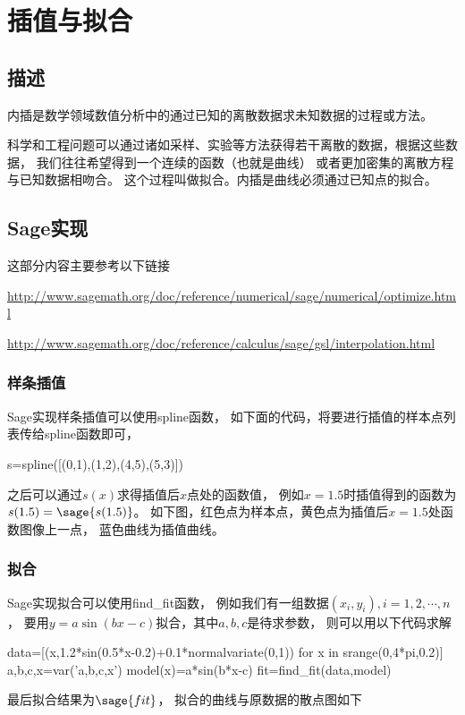 \section{插值与拟合}
\subsection{描述}
内插是数学领域数值分析中的通过已知的离散数据求未知数据的过程或方法。

科学和工程问题可以通过诸如采样、实验等方法获得若干离散的数据，根据这些数据，
我们往往希望得到一个连续的函数（也就是曲线）
或者更加密集的离散方程与已知数据相吻合。
这个过程叫做拟合。内插是曲线必须通过已知点的拟合。

\subsection{Sage实现}
这部分内容主要参考以下链接

\href{http://www.sagemath.org/doc/reference/numerical/sage/numerical/optimize.html}{http://www.sagemath.org/doc/reference/numerical/sage/numerical/optimize.html}

\href{http://www.sagemath.org/doc/reference/calculus/sage/gsl/interpolation.html}{http://www.sagemath.org/doc/reference/calculus/sage/gsl/interpolation.html}

\subsubsection{样条插值}
Sage实现样条插值可以使用spline函数，
如下面的代码，将要进行插值的样本点列表传给spline函数即可，
\begin{sageblock}
s=spline([(0,1),(1,2),(4,5),(5,3)])
\end{sageblock}
之后可以通过$s(x)$求得插值后$x$点处的函数值，
例如$x=1.5$时插值得到的函数为$s(1.5)=\sage{s(1.5)}$。
如下图，红色点为样本点，黄色点为插值后$x=1.5$处函数图像上一点，
蓝色曲线为插值曲线。


\subsubsection{拟合}
Sage实现拟合可以使用find\_fit函数，
例如我们有一组数据$(x_i,y_i),i=1,2,\cdots,n$，
要用$y=a\sin(bx-c)$拟合，其中$a,b,c$是待求参数，
则可以用以下代码求解
\begin{sageblock}
data=[(x,1.2*sin(0.5*x-0.2)+0.1*normalvariate(0,1)) for x in srange(0,4*pi,0.2)]
a,b,c,x=var('a,b,c,x')
model(x)=a*sin(b*x-c)
fit=find_fit(data,model)
\end{sageblock}

最后拟合结果为$\sage{fit}$，
拟合的曲线与原数据的散点图如下


